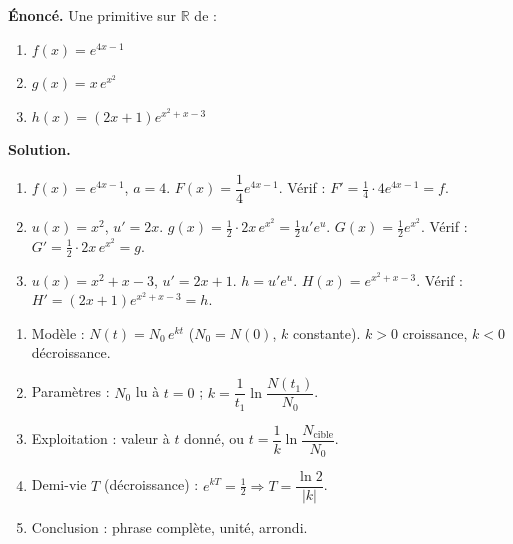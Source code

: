 \documentclass[11pt]{article}
\newcommand{\cle}[1]{{\popxbold\color{popdark}#1}}
\begin{document}
\begin{exoresolu}
\textbf{Énoncé.} Une primitive sur $\mathbb{R}$ de :
\begin{enumerate}
\item $f(x)=e^{4x-1}$
\item $g(x)=x\,e^{x^{2}}$
\item $h(x)=(2x+1)e^{x^{2}+x-3}$
\end{enumerate}
\tcblower
\textbf{Solution.}
\begin{enumerate}
\item $f(x)=e^{4x-1}$, $a=4$. $F(x)=\dfrac{1}{4}e^{4x-1}$. Vérif : $F'=\frac{1}{4}\cdot 4e^{4x-1}=f$.
\item $u(x)=x^{2}$, $u'=2x$. $g(x)=\frac{1}{2}\cdot 2x\,e^{x^{2}}=\frac{1}{2}u'e^{u}$. $G(x)=\frac{1}{2}e^{x^{2}}$. Vérif : $G'=\frac{1}{2}\cdot 2x\,e^{x^{2}}=g$.
\item $u(x)=x^{2}+x-3$, $u'=2x+1$. $h=u'e^{u}$. $H(x)=e^{x^{2}+x-3}$. Vérif : $H'=(2x+1)e^{x^{2}+x-3}=h$.
\end{enumerate}
\end{exoresolu}

\begin{methode}
\begin{enumerate}
\item \cle{Modèle} : $N(t)=N_{0}\,e^{kt}$ ($N_{0}=N(0)$, $k$ constante). $k>0$ croissance, $k<0$ décroissance.
\item \cle{Paramètres} : $N_{0}$ lu à $t=0$ ; $k=\dfrac{1}{t_{1}}\ln\dfrac{N(t_{1})}{N_{0}}$.
\item \cle{Exploitation} : valeur à $t$ donné, ou $t=\dfrac{1}{k}\ln\dfrac{N_{\text{cible}}}{N_{0}}$.
\item \cle{Demi-vie} $T$ (décroissance) : $e^{kT}=\frac{1}{2} \Rightarrow T=\dfrac{\ln 2}{|k|}$.
\item \cle{Conclusion} : phrase complète, unité, arrondi.
\end{enumerate}
\end{methode}
\end{document}
